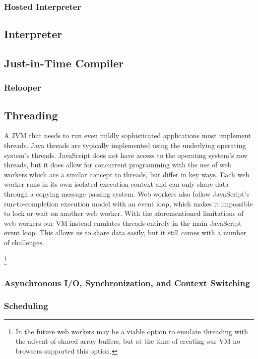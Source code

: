 \documentclass{acm_proc_article-sp}
\begin{document}
\subsubsection{Hosted Interpreter}

\subsection{Interpreter}

\subsection{Just-in-Time Compiler}

\subsubsection{Relooper}

\subsection{Threading}

A JVM that needs to run even mildly sophisticated applications must implement threads.
Java threads are typically implemented using the underlying operating system's threads.
JavaScript does not have access to the operating system's raw threads, but it does allow for concurrent programming with the use of web workers which are a similar concept to threads, but differ in key ways.
Each web worker runs in its own isolated execution context and can only share data through a copying message passing system.
Web workers also follow JavaScript's run-to-completion execution model with an event loop, which makes it impossible to lock or wait on another web worker.
With the aforementioned limitations of web workers our VM instead emulates threads entirely in the main JavaScript event loop.
This allows us to share data easily, but it still comes with a number of challenges.

\footnote{In the future web workers may be a viable option to emulate threading with the advent of shared array buffers, but at the time of creating our VM no browsers supported this option.}

\subsubsection{Asynchronous I/O, Synchronization, and Context Switching}

\subsubsection{Scheduling}
\end{document}
